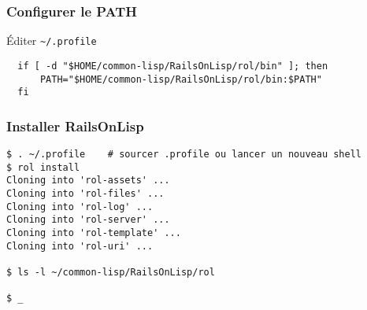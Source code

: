 \documentclass[8pt]{beamer}
\begin{document}
\begin{frame}[fragile]
  \frametitle{Configurer le PATH}
  Éditer \tt{\textasciitilde/.profile}
\begin{verbatim}
  if [ -d "$HOME/common-lisp/RailsOnLisp/rol/bin" ]; then
      PATH="$HOME/common-lisp/RailsOnLisp/rol/bin:$PATH"
  fi
\end{verbatim}
\end{frame}

\begin{frame}[fragile]
  \frametitle{Installer RailsOnLisp}
\begin{verbatim}
$ . ~/.profile    # sourcer .profile ou lancer un nouveau shell
$ rol install
Cloning into 'rol-assets' ...
Cloning into 'rol-files' ...
Cloning into 'rol-log' ...
Cloning into 'rol-server' ...
Cloning into 'rol-template' ...
Cloning into 'rol-uri' ...

$ ls -l ~/common-lisp/RailsOnLisp/rol

$ _
\end{verbatim}
\end{frame}
\end{document}

